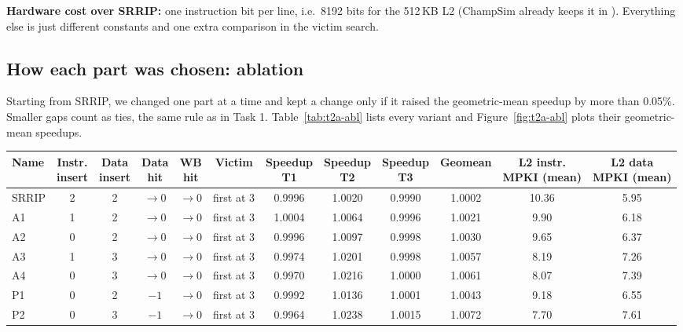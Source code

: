 \textbf{Hardware cost over SRRIP:} one instruction bit per line, i.e.\ 8192 bits for the 512\,KB L2 (ChampSim already
keeps it in ). Everything else is just different constants and one extra comparison in
the victim search.

\subsection{How each part was chosen: ablation}
Starting from SRRIP, we changed one part at a time and kept a change only if it raised the geometric-mean speedup
by more than 0.05\%. Smaller gaps count as ties, the same rule as in Task 1. Table~\ref{tab:t2a-abl} lists every
variant and Figure~\ref{fig:t2a-abl} plots their geometric-mean speedups.

\begin{table}[H]\centering\small
\setlength{\tabcolsep}{3.6pt}
\begin{tabular}{@{}lccccccccccc@{}}
\toprule
Name & \makecell{Instr.\\insert} & \makecell{Data\\insert} & \makecell{Data\\hit} & \makecell{WB\\hit} & Victim
     & \makecell{Speedup\\T1} & \makecell{Speedup\\T2} & \makecell{Speedup\\T3} & Geomean
     & \makecell{L2 instr.\\MPKI (mean)} & \makecell{L2 data\\MPKI (mean)} \\
\midrule
SRRIP & 2 & 2 & $\to$0 & $\to$0 & first at 3 & 0.9996 & 1.0020 & 0.9990 & 1.0002 & 10.36 & 5.95 \\
A1    & 1 & 2 & $\to$0 & $\to$0 & first at 3 & 1.0004 & 1.0064 & 0.9996 & 1.0021 & 9.90 & 6.18 \\
A2    & 0 & 2 & $\to$0 & $\to$0 & first at 3 & 0.9996 & 1.0097 & 0.9998 & 1.0030 & 9.65 & 6.37 \\
A3    & 1 & 3 & $\to$0 & $\to$0 & first at 3 & 0.9974 & 1.0201 & 0.9998 & 1.0057 & 8.19 & 7.26 \\
A4    & 0 & 3 & $\to$0 & $\to$0 & first at 3 & 0.9970 & 1.0216 & 1.0000 & 1.0061 & 8.07 & 7.39 \\
P1    & 0 & 2 & $-1$   & $\to$0 & first at 3 & 0.9992 & 1.0136 & 1.0001 & 1.0043 & 9.18 & 6.55 \\
P2    & 0 & 3 & $-1$   & $\to$0 & first at 3 & 0.9964 & 1.0238 & 1.0015 & 1.0072 & 7.70 & 7.61 \\

\end{tabular}
\end{table}
